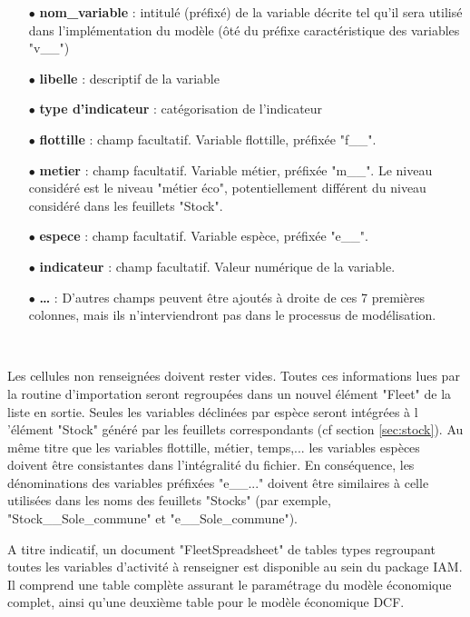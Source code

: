 \documentclass[12pt, colorinlistoftodos]{article}
\newenvironment{not used}[1]{%
    \longtable{%
        |>{\centering$\displaystyle}A{#1}{1}<{$}%
        |}\hline\ignorespaces}{%
    \endlongtable\ignorespacesafterend}
\begin{document}
\begin{itemize}
    \item[$\bullet$] \textbf{nom\_variable} : intitulé (préfixé) de la variable décrite tel qu'il sera utilisé dans l'implémentation du modèle (ôté du préfixe caractéristique des variables "v\_\_")
    \item[$\bullet$] \textbf{libelle} : descriptif de la variable
    \item[$\bullet$] \textbf{type d'indicateur} : catégorisation de l'indicateur
    \item[$\bullet$] \textbf{flottille} : champ facultatif. Variable flottille, préfixée "f\_\_".
    \item[$\bullet$] \textbf{metier} : champ facultatif. Variable métier, préfixée "m\_\_". Le niveau considéré est le niveau "métier éco", potentiellement différent du niveau considéré dans les feuillets "Stock".
    \item[$\bullet$] \textbf{espece} : champ facultatif. Variable espèce, préfixée "e\_\_".
    \item[$\bullet$] \textbf{indicateur} : champ facultatif. Valeur numérique de la variable.
    \item[$\bullet$] \textbf{…} : D'autres champs peuvent être ajoutés à droite de ces 7 premières colonnes, mais ils n'interviendront pas dans le processus de modélisation.
\end{itemize}

\par~\par

Les cellules non renseignées doivent rester vides. Toutes ces informations lues par la routine d'importation seront regroupées dans un nouvel élément "Fleet" de  la liste en sortie. Seules les variables déclinées par espèce seront intégrées à l 'élément "Stock" généré par les feuillets correspondants (cf section \ref{sec:stock}). Au même titre que les variables flottille, métier, temps,... les variables espèces doivent être consistantes dans l'intégralité du fichier. En conséquence, les dénominations des variables préfixées "e\_\_..." doivent être similaires à celle utilisées dans les noms des feuillets "Stocks" (par exemple, "Stock\_\_Sole\_commune" et "e\_\_Sole\_commune").

A titre indicatif, un document "FleetSpreadsheet" de tables types regroupant toutes les variables d'activité à renseigner est disponible au sein du package IAM. Il comprend une table complète assurant le paramétrage du modèle économique complet, ainsi qu'une deuxième table pour le modèle économique DCF.  
\end{document}
